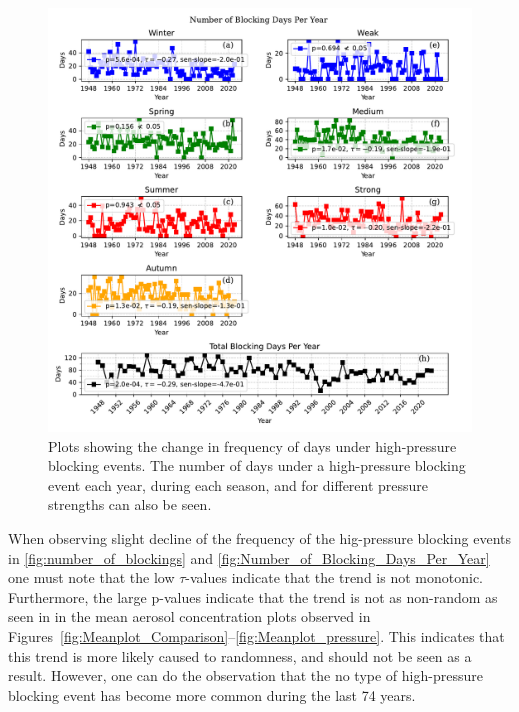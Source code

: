 \begin{figure}[H]
    \centering
    \includegraphics[width=\textwidth]{Figures/blocking_days_per_year_all.pdf}
    \caption{Plots showing the change in frequency of days under high-pressure blocking events. The number of days under a high-pressure blocking event each year, during each season, and for different pressure strengths can also be seen.}
    \label{fig:Number_of_Blocking_Days_Per_Year}
\end{figure}

When observing slight decline of the frequency of the hig-pressure blocking events in \autoref{fig:number_of_blockings} and \autoref{fig:Number_of_Blocking_Days_Per_Year} one must note that the low $\tau$-values indicate that the trend is not monotonic. Furthermore, the large p-values indicate that the trend is not as non-random as seen in in the mean aerosol concentration plots observed in Figures~\ref{fig:Meanplot_Comparison}--\ref{fig:Meanplot_pressure}. This indicates that this trend is more likely caused to randomness, and should not be seen as a result. However, one can do the observation that the no type of high-pressure blocking event has become more common during the last 74 years. 
